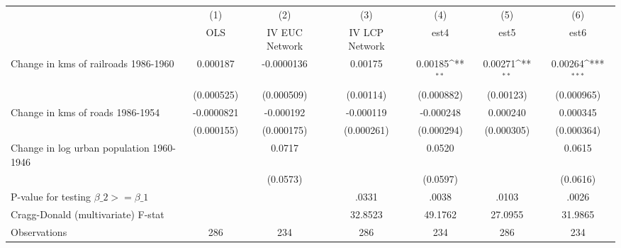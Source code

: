 {
\def\sym#1{\ifmmode^{#1}\else\(^{#1}\)\fi}
\begin{tabular}{l*{6}{c}}
\hline\hline
                &\multicolumn{1}{c}{(1)}&\multicolumn{1}{c}{(2)}&\multicolumn{1}{c}{(3)}&\multicolumn{1}{c}{(4)}&\multicolumn{1}{c}{(5)}&\multicolumn{1}{c}{(6)}\\
                &\multicolumn{1}{c}{OLS}&\multicolumn{1}{c}{IV EUC Network}&\multicolumn{1}{c}{IV LCP Network}&\multicolumn{1}{c}{est4}&\multicolumn{1}{c}{est5}&\multicolumn{1}{c}{est6}\\
\hline
Change in kms of railroads 1986-1960& 0.000187         &-0.0000136         &  0.00175         &  0.00185\sym{**} &  0.00271\sym{**} &  0.00264\sym{***}\\
                &(0.000525)         &(0.000509)         &(0.00114)         &(0.000882)         &(0.00123)         &(0.000965)         \\
[1em]
Change in kms of roads 1986-1954&-0.0000821         &-0.000192         &-0.000119         &-0.000248         & 0.000240         & 0.000345         \\
                &(0.000155)         &(0.000175)         &(0.000261)         &(0.000294)         &(0.000305)         &(0.000364)         \\
[1em]
Change in log urban population 1960-1946&                  &   0.0717         &                  &   0.0520         &                  &   0.0615         \\
                &                  & (0.0573)         &                  & (0.0597)         &                  & (0.0616)         \\
\hline
P-value for testing $\beta\_{2} >= \beta\_{1}$&                  &                  &    .0331         &    .0038         &    .0103         &    .0026         \\
Cragg-Donald (multivariate) F-stat&                  &                  &  32.8523         &  49.1762         &  27.0955         &  31.9865         \\
Observations    &      286         &      234         &      286         &      234         &      286         &      234         \\
\hline\hline
\end{tabular}
}
